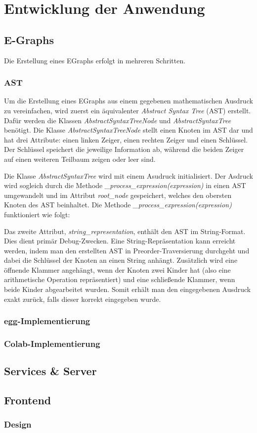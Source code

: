 \section{Entwicklung der Anwendung}\label{sec:entwicklung}

\subsection{E-Graphs}

Die Erstellung eines EGraphs erfolgt in mehreren Schritten. 

\subsubsection{AST}

Um die Erstellung eines EGraphs aus einem gegebenen mathematischen Ausdruck zu vereinfachen, wird zuerst ein äquivalenter \textit{Abstract Syntax Tree} (AST)
erstellt. Dafür werden die Klassen \textit{AbstractSyntaxTreeNode} und \textit{AbstractSyntaxTree} benötigt.
Die Klasse \textit{AbstractSyntaxTreeNode} stellt einen Knoten im AST dar und hat drei Attribute: einen linken Zeiger, einen rechten Zeiger und einen Schlüssel.
Der Schlüssel speichert die jeweilige Information ab, während die beiden Zeiger auf einen weiteren Teilbaum zeigen oder leer sind.

Die Klasse \textit{AbstractSyntaxTree} wird mit einem Asudruck initialisiert. Der Asdruck wird sogleich durch die Methode \textit{\_process\_expression(expression)} 
in einen AST umgewandelt und im Attribut \textit{root\_node} gespeichert, welches den obersten Knoten des AST beinhaltet. 
Die Methode \textit{\_process\_expression(expression)} funktioniert wie folgt:




Das zweite Attribut, \textit{string\_representation}, enthält den AST im String-Format. Dies dient primär Debug-Zwecken.
Eine String-Repräsentation kann erreicht werden, indem man den erstellten AST in Preorder-Traversierung durchgeht und dabei die Schlüssel der Knoten an einen String anhängt.
Zusätzlich wird eine öffnende Klammer angehängt, wenn der Knoten zwei Kinder hat (also eine arithmetische Operation repräsentiert) und eine schließende Klammer,
wenn beide Kinder abgearbeitet wurden. Somit erhält man den eingegebenen Ausdruck exakt zurück, falls dieser korrekt eingegeben wurde.

\subsubsection{egg-Implementierung}

\subsubsection{Colab-Implementierung}

\subsection{Services \& Server}

\subsection{Frontend}

\subsubsection{Design}
